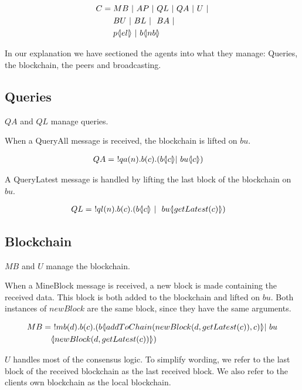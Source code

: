 \begin{align*}
    C &= MB\ |\ AP\ |\ QL\ |\ QA\ |\ U\ |\\
    &\quad \ BU\ |\ BL\ |\ \ BA\ |\\
    &\quad \ p \langle \! | el | \! \rangle\ |\ b \langle \! | nb | \! \rangle
\end{align*}

In our explanation we have sectioned the agents into what they manage: Queries, the blockchain, the peers and broadcasting.

\subsection{Queries}

$QA$ and $QL$ manage queries.

When a QueryAll message is received, the blockchain is lifted on $bu$.

\begin{align*}
    QA &=\ !qa(n).b(c).(b \langle \! | c | \! \rangle| \ bu \langle \! | c | \! \rangle)
\end{align*}

A QueryLatest message is handled by lifting the last block of the blockchain on $bu$.

\begin{align*}
	QL &=\ !ql(n).b(c).(b  \langle \! | c | \! \rangle\ |\ \ bu \langle \! | getLatest(c) | \! \rangle)
\end{align*}

\subsection{Blockchain}

$MB$ and $U$ manage the blockchain.

When a MineBlock message is received, a new block is made containing the received data.
This block is both added to the blockchain and lifted on $bu$.
Both instances of $newBlock$ are the same block, since they have the same arguments.

\begin{align*}
    MB &=\ !mb(d).b(c).(b  \langle \! | addToChain(newBlock(d,getLatest(c)),c) | \! \rangle| \ bu\\
    &\quad  \langle \! | newBlock(d, getLatest(c)) | \! \rangle)
\end{align*}

$U$ handles most of the consensus logic.
To simplify wording, we refer to the last block of the received blockchain as the last received block.
We also refer to the clients own blockchain as the local blockchain.

